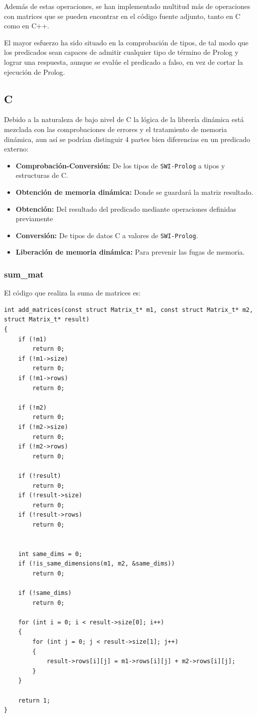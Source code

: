 \documentclass[a4paper]{article}
\begin{document}
Además de estas operaciones, se han implementado multitud más de operaciones con matrices que se pueden encontrar en el código fuente adjunto, tanto en C como en C++.

El mayor esfuerzo ha sido situado en la comprobación de tipos, de tal modo que los predicados sean capaces de admitir cualquier tipo de término de Prolog y lograr una respuesta, aunque se evalúe el predicado a falso, en vez de cortar la ejecución de Prolog.

\subsection{C}
Debido a la naturaleza de bajo nivel de C la lógica de la librería dinámica está mezclada con las comprobaciones de errores y el tratamiento de memoria dinámica, aun así se podrían distinguir 4 partes bien diferencias en un predicado externo:
\begin{itemize}
	\item \textbf{Comprobación-Conversión:} De los tipos de \texttt{SWI-Prolog} a tipos y estructuras de C.
	\item \textbf{Obtención de memoria dinámica:} Donde se guardará la matriz resultado.
	\item \textbf{Obtención:} Del resultado del predicado mediante operaciones definidas previamente
	\item \textbf{Conversión:} De tipos de datos C a valores de \texttt{SWI-Prolog}.
	\item \textbf{Liberación de memoria dinámica:} Para prevenir las fugas de memoria.
\end{itemize}
\subsubsection{sum\_mat}
El código que realiza la suma de matrices es:
\begin{lstlisting}[style=C++]
int add_matrices(const struct Matrix_t* m1, const struct Matrix_t* m2, struct Matrix_t* result)
{
    if (!m1)
        return 0;
    if (!m1->size)
        return 0;
    if (!m1->rows)
        return 0;

    if (!m2)
        return 0;
    if (!m2->size)
        return 0;
    if (!m2->rows)
        return 0;

    if (!result)
        return 0;
    if (!result->size)
        return 0;
    if (!result->rows)
        return 0;


    int same_dims = 0;
    if (!is_same_dimensions(m1, m2, &same_dims))
        return 0;

    if (!same_dims)
    	return 0;

    for (int i = 0; i < result->size[0]; i++)
    {
        for (int j = 0; j < result->size[1]; j++)
        {
            result->rows[i][j] = m1->rows[i][j] + m2->rows[i][j];
        }
    }

    return 1;
}
\end{lstlisting}
\end{document}

